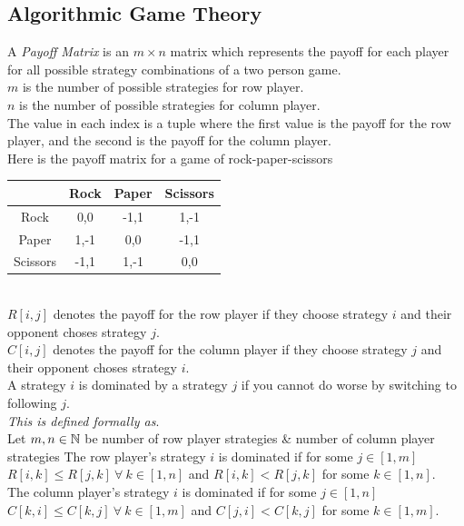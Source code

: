 \documentclass[11pt,a4paper]{article}
\begin{document}
\subsection{Algorithmic Game Theory}

A \textit{Payoff Matrix} is an $m\times n$ matrix which represents the payoff for each player for all possible strategy combinations of a two person game.\\
$m$ is the number of possible strategies for row player.\\
$n$ is the number of possible strategies for column player.\\
The value in each index is a tuple where the first value is the payoff for the row player, and the second is the payoff for the column player.\\

Here is the payoff matrix for a game of rock-paper-scissors\\
\begin{tabular}{|c|c|c|c|}
\hline
&Rock&Paper&Scissors\\
\hline
Rock&0,0&-1,1&1,-1\\
\hline
Paper&1,-1&0,0&-1,1\\
\hline
Scissors&-1,1&1,-1&0,0\\
\hline
\end{tabular}\\

\newpage
{}
$R[i,j]$ denotes the payoff for the row player if they choose strategy $i$ and their opponent choses strategy $j$.\\
$C[i,j]$ denotes the payoff for the column player if they choose strategy $j$ and their opponent choses strategy $i$.\\

A strategy $i$ is dominated by a strategy $j$ if you cannot do worse by switching to following $j$.\\
\textit{This is defined formally as}.\\
Let $m,n\in\mathbb{N}$ be number of row player strategies \& number of column player strategies
The row player's strategy $i$ is dominated if for some $j\in[1,m]$\\
$R[i,k]\leq R[j,k]\ \forall\ k\in[1,n]$ and $R[i,k]<R[j,k]$ for some $k\in[1,n]$.\\
The column player's strategy $i$ is dominated if for some $j\in[1,n]$\\
$C[k,i]\leq C[k,j]\ \forall\ k\in[1,m]$ and $C[j,i]<C[k,j]$ for some $k\in[1,m]$.\\
\end{document}
